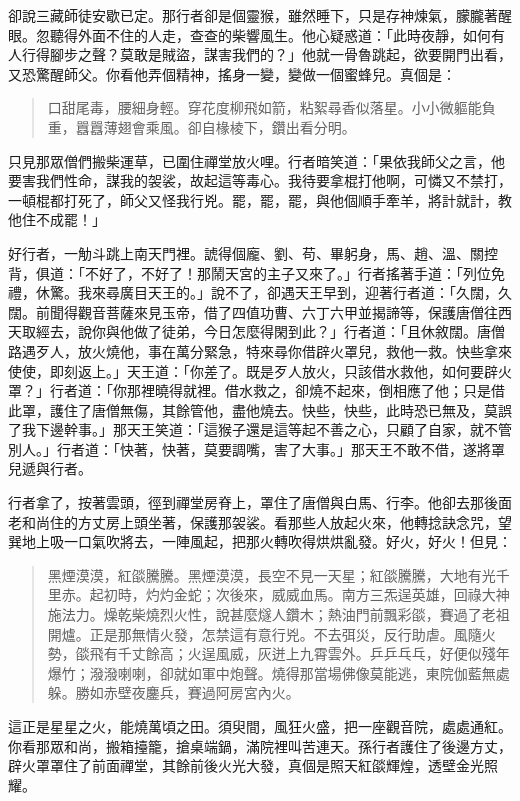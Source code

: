 卻說三藏師徒安歇已定。那行者卻是個靈猴，雖然睡下，只是存神煉氣，朦朧著醒眼。忽聽得外面不住的人走，查查的柴響風生。他心疑惑道：「此時夜靜，如何有人行得腳步之聲？莫敢是賊盜，謀害我們的？」他就一骨魯跳起，欲要開門出看，又恐驚醒師父。你看他弄個精神，搖身一變，變做一個蜜蜂兒。真個是：
\begin{quote}
口甜尾毒，腰細身輕。穿花度柳飛如箭，粘絮尋香似落星。小小微軀能負重，囂囂薄翅會乘風。卻自椽棱下，鑽出看分明。
\end{quote}

只見那眾僧們搬柴運草，已圍住禪堂放火哩。行者暗笑道：「果依我師父之言，他要害我們性命，謀我的袈裟，故起這等毒心。我待要拿棍打他啊，可憐又不禁打，一頓棍都打死了，師父又怪我行兇。罷，罷，罷，與他個順手牽羊，將計就計，教他住不成罷！」

好行者，一觔斗跳上南天門裡。諕得個龐、劉、苟、畢躬身，馬、趙、溫、關控背，俱道：「不好了，不好了！那鬧天宮的主子又來了。」行者搖著手道：「列位免禮，休驚。我來尋廣目天王的。」說不了，卻遇天王早到，迎著行者道：「久闊，久闊。前聞得觀音菩薩來見玉帝，借了四值功曹、六丁六甲並揭諦等，保護唐僧往西天取經去，說你與他做了徒弟，今日怎麼得閑到此？」行者道：「且休敘闊。唐僧路遇歹人，放火燒他，事在萬分緊急，特來尋你借辟火罩兒，救他一救。快些拿來使使，即刻返上。」天王道：「你差了。既是歹人放火，只該借水救他，如何要辟火罩？」行者道：「你那裡曉得就裡。借水救之，卻燒不起來，倒相應了他；只是借此罩，護住了唐僧無傷，其餘管他，盡他燒去。快些，快些，此時恐已無及，莫誤了我下邊幹事。」那天王笑道：「這猴子還是這等起不善之心，只顧了自家，就不管別人。」行者道：「快著，快著，莫要調嘴，害了大事。」那天王不敢不借，遂將罩兒遞與行者。

行者拿了，按著雲頭，徑到禪堂房脊上，罩住了唐僧與白馬、行李。他卻去那後面老和尚住的方丈房上頭坐著，保護那袈裟。看那些人放起火來，他轉捻訣念咒，望巽地上吸一口氣吹將去，一陣風起，把那火轉吹得烘烘亂發。好火，好火！但見：
\begin{quote}
黑煙漠漠，紅燄騰騰。黑煙漠漠，長空不見一天星；紅燄騰騰，大地有光千里赤。起初時，灼灼金蛇；次後來，威威血馬。南方三炁逞英雄，回祿大神施法力。燥乾柴燒烈火性，說甚麼燧人鑽木；熱油門前飄彩燄，賽過了老祖開爐。正是那無情火發，怎禁這有意行兇。不去弭災，反行助虐。風隨火勢，燄飛有千丈餘高；火逞風威，灰迸上九霄雲外。乒乒乓乓，好便似殘年爆竹；潑潑喇喇，卻就如軍中炮聲。燒得那當場佛像莫能逃，東院伽藍無處躲。勝如赤壁夜鏖兵，賽過阿房宮內火。
\end{quote}

這正是星星之火，能燒萬頃之田。須臾間，風狂火盛，把一座觀音院，處處通紅。你看那眾和尚，搬箱擡籠，搶桌端鍋，滿院裡叫苦連天。孫行者護住了後邊方丈，辟火罩罩住了前面禪堂，其餘前後火光大發，真個是照天紅燄輝煌，透壁金光照耀。

